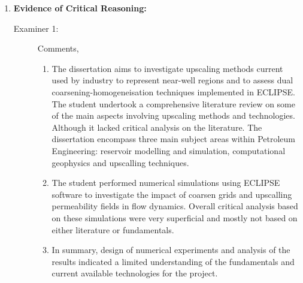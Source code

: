 \documentclass[14pt,twoside]{report}
\begin{document}
\begin{enumerate}
%
    \item {\bf Evidence of Critical Reasoning:}
        \begin{description}
            \item[Examiner 1:] Comments,
                \begin{enumerate}
                   \item The dissertation aims to investigate upscaling methods current used by industry to represent near-well regions and to assess dual coarsening-homogeneisation techniques implemented in ECLIPSE. The student undertook a comprehensive literature review on some of the main aspects involving upscaling methods and technologies. Although it lacked critical analysis on the literature. The dissertation encompass three main subject areas within Petroleum Engineering: reservoir modelling and simulation, computational geophysics and upscalling techniques.
                   \item The student performed numerical simulations using ECLIPSE software to investigate the impact of coarsen grids and upscalling permeability fields in flow dynamics. Overall critical analysis based on these simulations were very superficial and mostly not based on either literature or fundamentals.
                   \item In summary, design of numerical experiments and analysis of the results indicated a limited understanding of the fundamentals and current available technologies for the project. 

\end{enumerate}
\end{description}
\end{enumerate}
\end{document}
